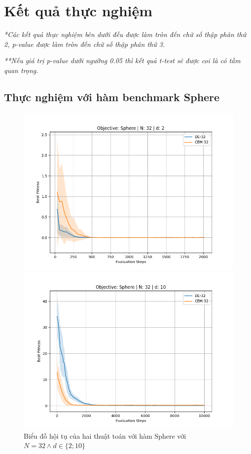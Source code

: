 \documentclass[10pt]{report}
\begin{document}
\chapter{Kết quả thực nghiệm}
\emph{*Các kết quả thực nghiệm bên dưới đều được làm tròn đến chữ số thập phân thứ 2, \emph{p-value} được làm tròn đến chữ số thập phân thứ 3.}

\emph{**Nếu giá trị \emph{p-value} dưới ngưỡng 0.05 thì kết quả t-test sẽ được coi là có tầm quan trọng.}

\section{Thực nghiệm với hàm benchmark Sphere}
\begin{figure}[H]\centering
	\label{figure:sphere_comparison}
	\caption{Biểu đồ hội tụ của hai thuật toán với hàm Sphere với \(N = 32 \wedge d \in \{2; 10\}\)}
	\begin{minipage}{0.45\textwidth}\centering
		\includegraphics[width=\textwidth]{../assets/graphs/objective=Sphere_N=32_d=2.png}
	\end{minipage}
	\begin{minipage}{0.45\textwidth}\centering
		\includegraphics[width=\textwidth]{../assets/graphs/objective=Sphere_N=32_d=10.png}
	\end{minipage}
\end{figure}
\end{document}
